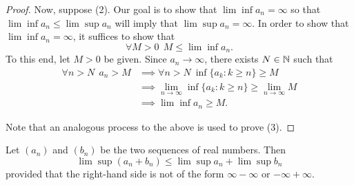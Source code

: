 \documentclass[a4paper]{article}
\begin{document}
\begin{proof}
    Now, suppose (2). Our goal is to show that \( \lim \inf  {a}_{n} = \infty  \) so that \( \lim \inf {a}_{n} \leq \lim \sup {a}_{n} \) will imply that \( \lim \sup  {a}_{n} = \infty  \). In order to show that \( \lim \inf {a}_{n} = \infty  \), it suffices to show that 
    \[  \forall M > 0 \ \ M \leq \lim \inf {a}_{n}. \]
    To this end, let \( M > 0  \) be given. Since \( {a}_{n} \to \infty   \), there exists \( N \in \mathbb{N} \) such that 
    \begin{align*}
        \forall  n  > N \ \ {a}_{n} > M &\implies \forall n > N  \  \inf \{ {a}_{k } : k \geq n  \}  \geq  M \\
                                        &\implies \lim_{ n \to \infty  }  \inf \{ {a}_{k } : k \geq n  \}  \geq \lim_{ n \to \infty   }  M \\
                                        &\implies \lim \inf {a}_{n} \geq M.
\end{align*}

Note that an analogous process to the above is used to prove (3). 
\end{proof}

\begin{theorem}[ ]
    Let \( ({a}_{n}) \) and \( ({b}_{n}) \) be the two sequences of real numbers. Then
    \[  \lim \sup ({a}_{n} + {b}_{n}) \leq \lim \sup {a}_{n} + \lim \sup {b}_{n}  \]
    provided that the right-hand side is not of the form \( \infty  - \infty   \) or \( - \infty  + \infty   \).
\end{theorem}
\end{document}
